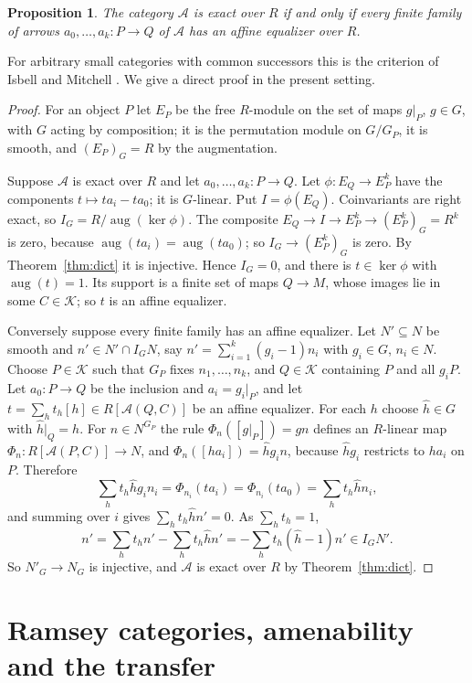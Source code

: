 \documentclass[11pt,a4paper]{article}
\newtheorem{proposition}[theorem]{Proposition}
\theoremstyle{definition}
\newcommand{\A}{\mathcal{A}}
\newcommand{\K}{\mathcal{K}}
\newcommand{\Z}{\mathbb{Z}}
\newcommand{\aug}{\operatorname{aug}}
\begin{document}
\begin{proposition}\label{prop:affine}
The category $\A$ is exact over $R$ if and only if every finite family of
arrows $a_0,\dots,a_k\colon P\to Q$ of $\A$ has an affine equalizer over $R$.
\end{proposition}

For arbitrary small categories with common successors this is the criterion
of Isbell and Mitchell \cite[Theorem~3.1, Proposition~3.3 and the remark after it, for a commutative ring in place of $\Z$]{IM}. We give a
direct proof in the present setting.

\begin{proof}
For an object $P$ let $E_P$ be the free $R$-module on the set of maps
$g|_P$, $g\in G$, with $G$ acting by composition; it is the permutation
module on $G/G_P$, it is smooth, and $(E_P)_G=R$ by the augmentation.

Suppose $\A$ is exact over $R$ and let $a_0,\dots,a_k\colon P\to Q$. Let
$\phi\colon E_Q\to E_P^k$ have the components $t\mapsto ta_i-ta_0$; it is
$G$-linear. Put $I=\phi(E_Q)$. Coinvariants are right exact, so
$I_G=R/\aug(\ker\phi)$. The composite $E_Q\to I\to E_P^k\to(E_P^k)_G=R^k$
is zero, because $\aug(ta_i)=\aug(ta_0)$; so $I_G\to(E_P^k)_G$ is zero. By
Theorem~\ref{thm:dict} it is injective. Hence $I_G=0$, and there is
$t\in\ker\phi$ with $\aug(t)=1$. Its support is a finite set of maps
$Q\to M$, whose images lie in some $C\in\K$; so $t$ is an affine equalizer.

Conversely suppose every finite family has an affine equalizer. Let
$N'\subseteq N$ be smooth and $n'\in N'\cap I_GN$, say
$n'=\sum_{i=1}^k(g_i-1)n_i$ with $g_i\in G$, $n_i\in N$. Choose $P\in\K$
such that $G_P$ fixes $n_1,\dots,n_k$, and $Q\in\K$ containing $P$ and all
$g_iP$. Let $a_0\colon P\to Q$ be the inclusion and $a_i=g_i|_P$, and let
$t=\sum_ht_h[h]\in R[\A(Q,C)]$ be an affine equalizer. For each $h$ choose
$\hat h\in G$ with $\hat h|_Q=h$. For $n\in N^{G_P}$ the rule
$\Phi_n([g|_P])=gn$ defines an $R$-linear map $\Phi_n\colon R[\A(P,C)]\to N$,
and $\Phi_n([ha_i])=\hat hg_in$, because $\hat hg_i$ restricts to $ha_i$ on
$P$. Therefore
\[
 \sum_ht_h\hat hg_in_i=\Phi_{n_i}(ta_i)=\Phi_{n_i}(ta_0)=\sum_ht_h\hat hn_i ,
\]
and summing over $i$ gives $\sum_ht_h\hat hn'=0$. As $\sum_ht_h=1$,
\[
 n'=\sum_ht_hn'-\sum_ht_h\hat hn'=-\sum_ht_h(\hat h-1)n'\in I_GN'.
\]
So $N'_G\to N_G$ is injective, and $\A$ is exact over $R$ by
Theorem~\ref{thm:dict}.
\end{proof}

\section{Ramsey categories, amenability and the transfer}\label{sec:transfer}
\end{document}
